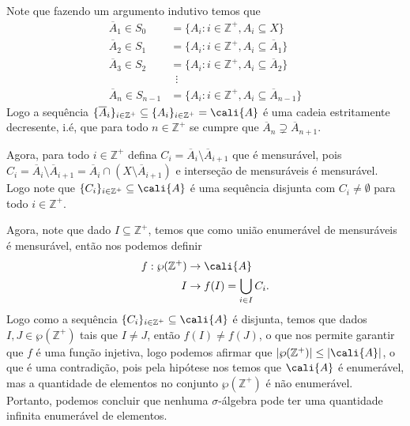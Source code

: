 \begin{homeworkProblem}[1]
\begin{solution}
    Note que fazendo um argumento indutivo temos que 
    \begin{align*}
      \overline{A}_1\in S_0&=\{A_i:i\in\mathbb{Z}^{+},A_i\subseteq X\}\\
      \overline{A}_2\in S_1&=\{A_i:i\in\mathbb{Z}^{+},A_i\subseteq \overline{A}_1\}\\
      \overline{A}_3\in S_2&=\{A_i:i\in\mathbb{Z}^{+},A_i\subseteq \overline{A}_2\}\\
      &\,\,\,\vdots\\
      \overline{A}_n\in S_{n-1}&=\{A_i:i\in\mathbb{Z}^{+},A_i\subseteq \overline{A}_{n-1}\}
    \end{align*}
    Logo a sequência $\{\overline{A}_i\}_{i\in\mathbb{Z}^{+}}\subseteq \{A_i\}_{i\in\mathbb{Z}^{+}}=\cali{A}$ é uma cadeia estritamente decresente, i.é, que para todo $n\in\mathbb{Z}^{+}$ se cumpre que $\overline{A}_n\supsetneq \overline{A}_{n+1}$.

    Agora, para todo $i\in\mathbb{Z}^{+}$ defina $C_i=\overline{A}_i\setminus\overline{A}_{i+1}$ que é mensurável, pois $C_i=\overline{A}_i\setminus\overline{A}_{i+1}=\overline{A}_{i}\cap(X\setminus \overline{A}_{i+1})$ e interseção de mensuráveis é mensurável. Logo note que $\{C_i\}_{i\in\mathbb{Z}^{+}}\subseteq\cali{A}$ é uma sequência disjunta com $C_i\neq \emptyset$ para todo $i\in\mathbb{Z}^{+}$.

    Agora, note que dado $I\subseteq \mathbb{Z}^{+}$, temos que como união enumerável de mensuráveis é mensurável, então nos podemos definir
    \begin{align*}
      f:\wp(\mathbb{Z}^{+})&\to\cali{A}\\
                          I&\to f(I)=\bigcup_{i\in I}C_i.
    \end{align*}
    Logo como a sequência $\{C_i\}_{i\in\mathbb{Z}^{+}}\subseteq \cali{A}$ é disjunta, temos que dados $I,J\in \wp(\mathbb{Z}^{+})$ tais  que $I\neq J$, então $f(I)\neq f(J)$, o que nos permite garantir que $f$ é uma função injetiva, logo podemos afirmar que $|\wp(\mathbb{Z}^{+})|\leq |\cali{A}|$, o que é uma contradição, pois pela hipótese nos temos que $\cali{A}$ é enumerável, mas a quantidade de elementos no conjunto $\wp(\mathbb{Z}^{+})$ é não enumerável.\\

    Portanto, podemos concluir que nenhuma $\sigma$-álgebra pode ter uma quantidade infinita enumerável de elementos.
  \end{solution}
\end{homeworkProblem}
